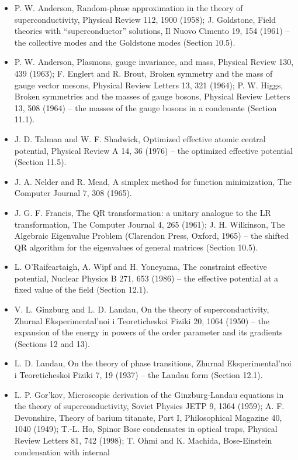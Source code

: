 \documentclass[
  10pt,
]{article}
\begin{document}
\begin{itemize}
\item
  P. W. Anderson, Random-phase approximation in the theory of
  superconductivity, Physical Review 112, 1900 (1958); J. Goldstone,
  Field theories with ``superconductor'' solutions, Il Nuovo Cimento 19,
  154 (1961) -- the collective modes and the Goldstone modes (Section
  10.5).
\item
  P. W. Anderson, Plasmons, gauge invariance, and mass, Physical Review
  130, 439 (1963); F. Englert and R. Brout, Broken symmetry and the mass
  of gauge vector mesons, Physical Review Letters 13, 321 (1964); P. W.
  Higgs, Broken symmetries and the masses of gauge bosons, Physical
  Review Letters 13, 508 (1964) -- the masses of the gauge bosons in a
  condensate (Section 11.1).
\item
  J. D. Talman and W. F. Shadwick, Optimized effective atomic central
  potential, Physical Review A 14, 36 (1976) -- the optimized effective
  potential (Section 11.5).
\item
  J. A. Nelder and R. Mead, A simplex method for function minimization,
  The Computer Journal 7, 308 (1965).
\item
  J. G. F. Francis, The QR transformation: a unitary analogue to the LR
  transformation, The Computer Journal 4, 265 (1961); J. H. Wilkinson,
  The Algebraic Eigenvalue Problem (Clarendon Press, Oxford, 1965) --
  the shifted QR algorithm for the eigenvalues of general matrices
  (Section 10.5).
\item
  L. O'Raifeartaigh, A. Wipf and H. Yoneyama, The constraint effective
  potential, Nuclear Physics B 271, 653 (1986) -- the effective
  potential at a fixed value of the field (Section 12.1).
\item
  V. L. Ginzburg and L. D. Landau, On the theory of superconductivity,
  Zhurnal Eksperimental'noi i Teoreticheskoi Fiziki 20, 1064 (1950) --
  the expansion of the energy in powers of the order parameter and its
  gradients (Sections 12 and 13).
\item
  L. D. Landau, On the theory of phase transitions, Zhurnal
  Eksperimental'noi i Teoreticheskoi Fiziki 7, 19 (1937) -- the Landau
  form (Section 12.1).
\item
  L. P. Gor'kov, Microscopic derivation of the Ginzburg-Landau equations
  in the theory of superconductivity, Soviet Physics JETP 9, 1364
  (1959); A. F. Devonshire, Theory of barium titanate, Part I,
  Philosophical Magazine 40, 1040 (1949); T.-L. Ho, Spinor Bose
  condensates in optical traps, Physical Review Letters 81, 742 (1998);
  T. Ohmi and K. Machida, Bose-Einstein condensation with internal

\end{itemize}
\end{document}
